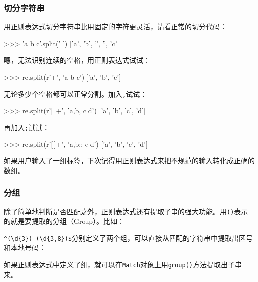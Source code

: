 \hypertarget{ux5207ux5206ux5b57ux7b26ux4e32}{%
\subsubsection{切分字符串}\label{ux5207ux5206ux5b57ux7b26ux4e32}}

用正则表达式切分字符串比用固定的字符更灵活，请看正常的切分代码：

\begin{pythoncode}
>>> 'a b   c'.split(' ')
['a', 'b', '', '', 'c']
\end{pythoncode}

嗯，无法识别连续的空格，用正则表达式试试：

\begin{pythoncode}
>>> re.split(r'\s+', 'a b   c')
['a', 'b', 'c']
\end{pythoncode}

无论多少个空格都可以正常分割。加入\texttt{,}试试：

\begin{pythoncode}
>>> re.split(r'[\s\,]+', 'a,b, c  d')
['a', 'b', 'c', 'd']
\end{pythoncode}

再加入\texttt{;}试试：

\begin{pythoncode}
>>> re.split(r'[\s\,\;]+', 'a,b;; c  d')
['a', 'b', 'c', 'd']
\end{pythoncode}

如果用户输入了一组标签，下次记得用正则表达式来把不规范的输入转化成正确的数组。

\hypertarget{ux5206ux7ec4}{%
\subsubsection{分组}\label{ux5206ux7ec4}}

除了简单地判断是否匹配之外，正则表达式还有提取子串的强大功能。用\texttt{()}表示的就是要提取的分组（Group）。比如：

\texttt{\^{}(\textbackslash{}d\{3\})-(\textbackslash{}d\{3,8\})\$}分别定义了两个组，可以直接从匹配的字符串中提取出区号和本地号码：


如果正则表达式中定义了组，就可以在\texttt{Match}对象上用\texttt{group()}方法提取出子串来。


